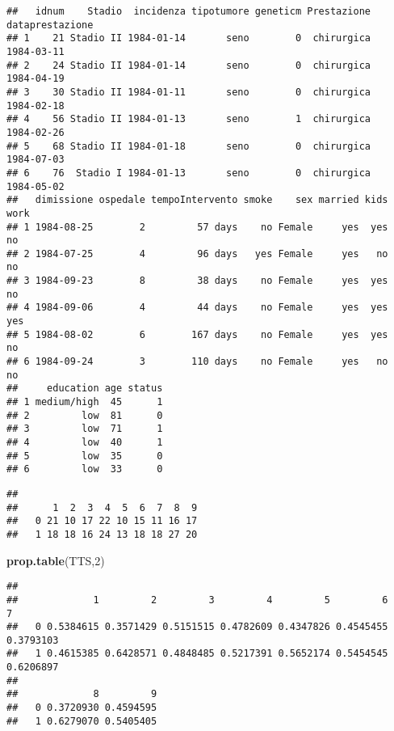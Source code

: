 \documentclass[]{article}
\newenvironment{Shaded}{\begin{snugshade}}{\end{snugshade}}
\newcommand{\DecValTok}[1]{\textcolor[rgb]{0.00,0.00,0.81}{#1}}
\newcommand{\KeywordTok}[1]{\textcolor[rgb]{0.13,0.29,0.53}{\textbf{#1}}}
\newcommand{\NormalTok}[1]{#1}
\newcommand{\OperatorTok}[1]{\textcolor[rgb]{0.81,0.36,0.00}{\textbf{#1}}}
\newcommand{\StringTok}[1]{\textcolor[rgb]{0.31,0.60,0.02}{#1}}
\begin{document}
\begin{verbatim}
##   idnum    Stadio  incidenza tipotumore geneticm Prestazione dataprestazione
## 1    21 Stadio II 1984-01-14       seno        0  chirurgica      1984-03-11
## 2    24 Stadio II 1984-01-14       seno        0  chirurgica      1984-04-19
## 3    30 Stadio II 1984-01-11       seno        0  chirurgica      1984-02-18
## 4    56 Stadio II 1984-01-13       seno        1  chirurgica      1984-02-26
## 5    68 Stadio II 1984-01-18       seno        0  chirurgica      1984-07-03
## 6    76  Stadio I 1984-01-13       seno        0  chirurgica      1984-05-02
##   dimissione ospedale tempoIntervento smoke    sex married kids work
## 1 1984-08-25        2         57 days    no Female     yes  yes   no
## 2 1984-07-25        4         96 days   yes Female     yes   no   no
## 3 1984-09-23        8         38 days    no Female     yes  yes   no
## 4 1984-09-06        4         44 days    no Female     yes  yes  yes
## 5 1984-08-02        6        167 days    no Female     yes  yes   no
## 6 1984-09-24        3        110 days    no Female     yes   no   no
##     education age status
## 1 medium/high  45      1
## 2         low  81      0
## 3         low  71      1
## 4         low  40      1
## 5         low  35      0
## 6         low  33      0
\end{verbatim}

\begin{Shaded}
\end{Shaded}

\begin{verbatim}
##    
##      1  2  3  4  5  6  7  8  9
##   0 21 10 17 22 10 15 11 16 17
##   1 18 18 16 24 13 18 18 27 20
\end{verbatim}

\begin{Shaded}
\begin{Highlighting}[]
\KeywordTok{prop.table}\NormalTok{(TTS,}\DecValTok{2}\NormalTok{)}
\end{Highlighting}
\end{Shaded}

\begin{verbatim}
##    
##             1         2         3         4         5         6         7
##   0 0.5384615 0.3571429 0.5151515 0.4782609 0.4347826 0.4545455 0.3793103
##   1 0.4615385 0.6428571 0.4848485 0.5217391 0.5652174 0.5454545 0.6206897
##    
##             8         9
##   0 0.3720930 0.4594595
##   1 0.6279070 0.5405405
\end{verbatim}
\end{document}

